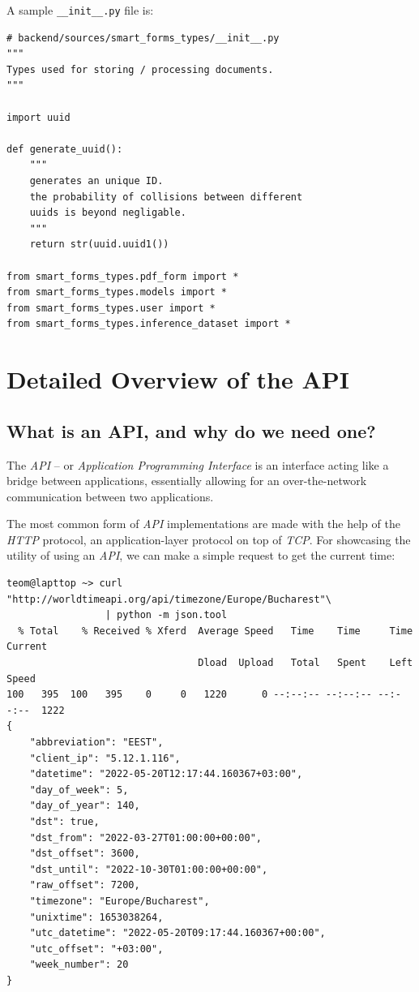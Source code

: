 \documentclass[11pt, a4paper]{report}
\def\code#1{\texttt{#1}}
\begin{document}
A sample \code{\_\_init\_\_.py} file is:

\begin{verbatim}
# backend/sources/smart_forms_types/__init__.py
"""
Types used for storing / processing documents.
"""

import uuid

def generate_uuid():
    """
    generates an unique ID.
    the probability of collisions between different
    uuids is beyond negligable.
    """
    return str(uuid.uuid1())

from smart_forms_types.pdf_form import *
from smart_forms_types.models import *
from smart_forms_types.user import *
from smart_forms_types.inference_dataset import *
\end{verbatim}

\chapter{Detailed Overview of the API}

\section{What is an API, and why do we need one?}

The \textit{API} -- or \textit{Application Programming Interface} is an interface acting like a bridge between applications, essentially allowing for an over-the-network communication between two applications.

The most common form of \textit{API} implementations are made with the help of the \textit{HTTP} protocol, an application-layer protocol on top of \textit{TCP}. For showcasing the utility of using an \textit{API}, we can make a simple request to get the current time:

\begin{verbatim}
teom@lapttop ~> curl "http://worldtimeapi.org/api/timezone/Europe/Bucharest"\
                 | python -m json.tool
  % Total    % Received % Xferd  Average Speed   Time    Time     Time  Current
                                 Dload  Upload   Total   Spent    Left  Speed
100   395  100   395    0     0   1220      0 --:--:-- --:--:-- --:--:--  1222
{
    "abbreviation": "EEST",
    "client_ip": "5.12.1.116",
    "datetime": "2022-05-20T12:17:44.160367+03:00",
    "day_of_week": 5,
    "day_of_year": 140,
    "dst": true,
    "dst_from": "2022-03-27T01:00:00+00:00",
    "dst_offset": 3600,
    "dst_until": "2022-10-30T01:00:00+00:00",
    "raw_offset": 7200,
    "timezone": "Europe/Bucharest",
    "unixtime": 1653038264,
    "utc_datetime": "2022-05-20T09:17:44.160367+00:00",
    "utc_offset": "+03:00",
    "week_number": 20
}
\end{verbatim}
\end{document}
